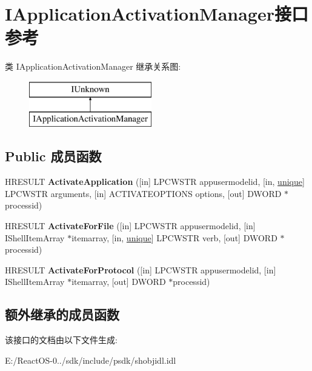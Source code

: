 \hypertarget{interface_i_application_activation_manager}{}\section{I\+Application\+Activation\+Manager接口 参考}
\label{interface_i_application_activation_manager}
类 I\+Application\+Activation\+Manager 继承关系图\+:\begin{figure}[H]
\begin{center}
\leavevmode
\includegraphics[height=2.000000cm]{interface_i_application_activation_manager}
\end{center}
\end{figure}
\subsection*{Public 成员函数}
\begin{DoxyCompactItemize}
\item 
\mbox{\label{interface_i_application_activation_manager_a896fd473880f1071696d7fe07db398ff}} 
H\+R\+E\+S\+U\+LT {\bfseries Activate\+Application} (\mbox{[}in\mbox{]} L\+P\+C\+W\+S\+TR appusermodelid, \mbox{[}in, \hyperlink{interfaceunique}{unique}\mbox{]} L\+P\+C\+W\+S\+TR arguments, \mbox{[}in\mbox{]} A\+C\+T\+I\+V\+A\+T\+E\+O\+P\+T\+I\+O\+NS options, \mbox{[}out\mbox{]} D\+W\+O\+RD $\ast$processid)
\item 
\mbox{\label{interface_i_application_activation_manager_a01eb1e2d66032538f4e7a6fa4555bc62}} 
H\+R\+E\+S\+U\+LT {\bfseries Activate\+For\+File} (\mbox{[}in\mbox{]} L\+P\+C\+W\+S\+TR appusermodelid, \mbox{[}in\mbox{]} I\+Shell\+Item\+Array $\ast$itemarray, \mbox{[}in, \hyperlink{interfaceunique}{unique}\mbox{]} L\+P\+C\+W\+S\+TR verb, \mbox{[}out\mbox{]} D\+W\+O\+RD $\ast$processid)
\item 
\mbox{\label{interface_i_application_activation_manager_a0f36038ecd8a1e98874c7a3eea940441}} 
H\+R\+E\+S\+U\+LT {\bfseries Activate\+For\+Protocol} (\mbox{[}in\mbox{]} L\+P\+C\+W\+S\+TR appusermodelid, \mbox{[}in\mbox{]} I\+Shell\+Item\+Array $\ast$itemarray, \mbox{[}out\mbox{]} D\+W\+O\+RD $\ast$processid)
\end{DoxyCompactItemize}
\subsection*{额外继承的成员函数}


该接口的文档由以下文件生成\+:\begin{DoxyCompactItemize}
\item 
E\+:/\+React\+O\+S-\/0../sdk/include/psdk/shobjidl.\+idl\end{DoxyCompactItemize}
